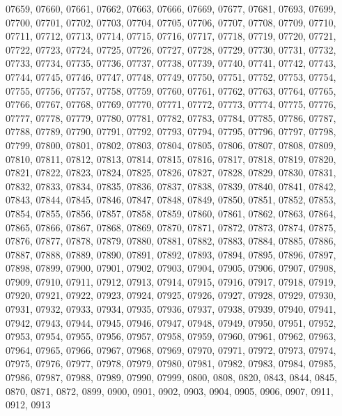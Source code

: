 {07659,
07660,
07661,
07662,
07663,
07666,
07669,
07677,
07681,
07693,
07699,
07700,
07701,
07702,
07703,
07704,
07705,
07706,
07707,
07708,
07709,
07710,
07711,
07712,
07713,
07714,
07715,
07716,
07717,
07718,
07719,
07720,
07721,
07722,
07723,
07724,
07725,
07726,
07727,
07728,
07729,
07730,
07731,
07732,
07733,
07734,
07735,
07736,
07737,
07738,
07739,
07740,
07741,
07742,
07743,
07744,
07745,
07746,
07747,
07748,
07749,
07750,
07751,
07752,
07753,
07754,
07755,
07756,
07757,
07758,
07759,
07760,
07761,
07762,
07763,
07764,
07765,
07766,
07767,
07768,
07769,
07770,
07771,
07772,
07773,
07774,
07775,
07776,
07777,
07778,
07779,
07780,
07781,
07782,
07783,
07784,
07785,
07786,
07787,
07788,
07789,
07790,
07791,
07792,
07793,
07794,
07795,
07796,
07797,
07798,
07799,
07800,
07801,
07802,
07803,
07804,
07805,
07806,
07807,
07808,
07809,
07810,
07811,
07812,
07813,
07814,
07815,
07816,
07817,
07818,
07819,
07820,
07821,
07822,
07823,
07824,
07825,
07826,
07827,
07828,
07829,
07830,
07831,
07832,
07833,
07834,
07835,
07836,
07837,
07838,
07839,
07840,
07841,
07842,
07843,
07844,
07845,
07846,
07847,
07848,
07849,
07850,
07851,
07852,
07853,
07854,
07855,
07856,
07857,
07858,
07859,
07860,
07861,
07862,
07863,
07864,
07865,
07866,
07867,
07868,
07869,
07870,
07871,
07872,
07873,
07874,
07875,
07876,
07877,
07878,
07879,
07880,
07881,
07882,
07883,
07884,
07885,
07886,
07887,
07888,
07889,
07890,
07891,
07892,
07893,
07894,
07895,
07896,
07897,
07898,
07899,
07900,
07901,
07902,
07903,
07904,
07905,
07906,
07907,
07908,
07909,
07910,
07911,
07912,
07913,
07914,
07915,
07916,
07917,
07918,
07919,
07920,
07921,
07922,
07923,
07924,
07925,
07926,
07927,
07928,
07929,
07930,
07931,
07932,
07933,
07934,
07935,
07936,
07937,
07938,
07939,
07940,
07941,
07942,
07943,
07944,
07945,
07946,
07947,
07948,
07949,
07950,
07951,
07952,
07953,
07954,
07955,
07956,
07957,
07958,
07959,
07960,
07961,
07962,
07963,
07964,
07965,
07966,
07967,
07968,
07969,
07970,
07971,
07972,
07973,
07974,
07975,
07976,
07977,
07978,
07979,
07980,
07981,
07982,
07983,
07984,
07985,
07986,
07987,
07988,
07989,
07990,
07999,
0800,
0808,
0820,
0843,
0844,
0845,
0870,
0871,
0872,
0899,
0900,
0901,
0902,
0903,
0904,
0905,
0906,
0907,
0911,
0912,
0913}
